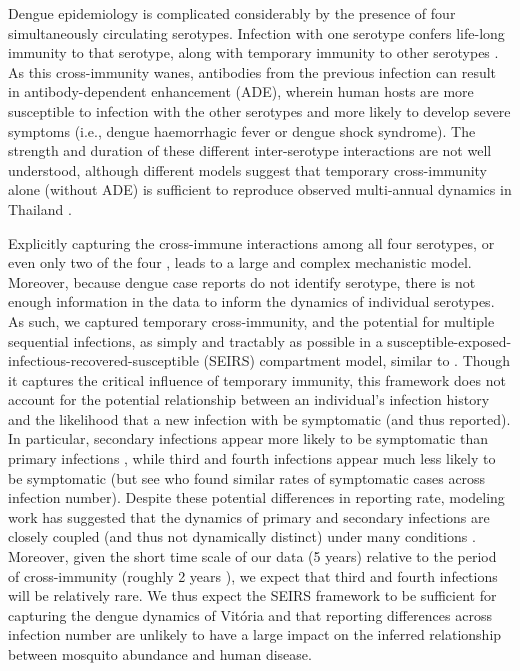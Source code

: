\documentclass[10pt,letterpaper]{article}
\begin{document}
Dengue epidemiology is complicated considerably by the presence of four simultaneously circulating serotypes.
Infection with one serotype confers life-long immunity to that serotype, along with temporary immunity to other serotypes \cite{Wearing2006}.  
As this cross-immunity wanes, antibodies from the previous infection can result in antibody-dependent enhancement (ADE), wherein human hosts are more susceptible to infection with the other serotypes and more likely to develop severe symptoms (i.e., dengue haemorrhagic fever or dengue shock syndrome)\cite{Wearing2006}.
The strength and duration of these different inter-serotype interactions are not well understood, although different models suggest that temporary cross-immunity alone (without ADE) is sufficient to reproduce observed multi-annual dynamics in Thailand \cite{Wearing2006,Reich2013}.

Explicitly capturing the cross-immune interactions among all four serotypes, or even only two of the four \cite{Aguiar2013}, leads to a large and complex mechanistic model.
Moreover, because dengue case reports do not identify serotype, there is not enough information in the data to inform the dynamics of individual serotypes.
As such, we captured temporary cross-immunity, and the potential for multiple sequential infections, as simply and tractably as possible in a susceptible-exposed-infectious-recovered-susceptible (SEIRS) compartment model, similar to \cite{Newton1992, Burattini2008, Pinho2010}.
Though it captures the critical influence of temporary immunity, this framework does not account for the potential relationship between an individual's infection history and the likelihood that a new infection with be symptomatic (and thus reported).
In particular, secondary infections appear more likely to be symptomatic than primary infections \cite{Imai2016,Clapham2017}, while third and fourth infections appear much less likely to be symptomatic \cite{Olkowski2013} (but see \cite{Montoya2013} who found similar rates of symptomatic cases across infection number).
Despite these potential differences in reporting rate, modeling work has suggested that the dynamics of primary and secondary infections are closely coupled (and thus not dynamically distinct) under many conditions \cite{Schwartz2005}.
Moreover, given the short time scale of our data (5 years) relative to the period of cross-immunity (roughly 2 years \cite{Reich2013}), we expect that third and fourth infections will be relatively rare.
We thus expect the SEIRS framework to be sufficient for capturing the dengue dynamics of Vit\'oria and that reporting differences across infection number are unlikely to have a large impact on the inferred relationship between mosquito abundance and human disease.
\end{document}
